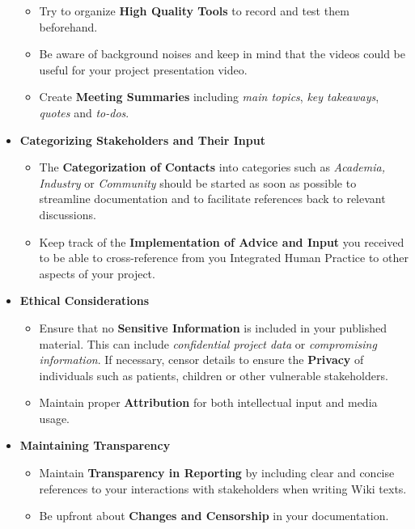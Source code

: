 \begin{itemize}
\begin{itemize}
        \item Try to organize \textbf{High Quality Tools} to record and test them beforehand.
        \item Be aware of background noises and keep in mind that the videos could be useful for your project presentation video.
        \item Create \textbf{Meeting Summaries} including \textit{main topics}, \textit{key takeaways}, \textit{quotes} and \textit{to-dos}.
    \end{itemize}
    \item \textbf{Categorizing Stakeholders and Their Input}
    \begin{itemize} 
    \item The \textbf{Categorization of Contacts} into categories such as \textit{Academia, Industry} or \textit{Community} should be started as soon as possible to streamline documentation and to facilitate references back to relevant discussions.
    \item Keep track of the \textbf{Implementation of Advice and Input} you received to be able to cross-reference from you Integrated Human Practice to other aspects of your project.
    \end{itemize}
    \item \textbf{Ethical Considerations}
    \begin{itemize}
        \item Ensure that no \textbf{Sensitive Information} is included in your published material.
        This can include \textit{confidential project data} or \textit{compromising information}.
        If necessary, censor details to ensure the \textbf{Privacy} of individuals such as patients, children or other vulnerable stakeholders.
        \item Maintain proper \textbf{Attribution} for both intellectual input and media usage.
    \end{itemize}
    \item \textbf{Maintaining Transparency}
    \begin{itemize}
        \item Maintain \textbf{Transparency in Reporting} by including clear and concise references to your interactions with stakeholders when writing Wiki texts.
        \item Be upfront about \textbf{Changes and Censorship} in your documentation.
    \end{itemize}
\end{itemize}
